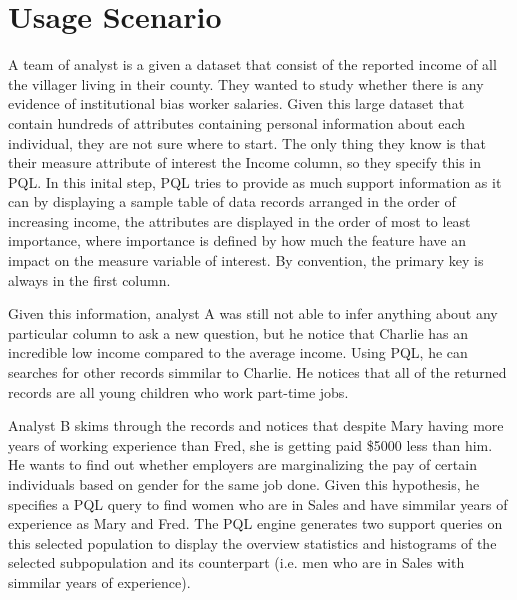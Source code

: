 \documentclass{sig-alternate-05-2015}
\begin{document}
\section{Usage Scenario}
\par A team of analyst is a given a dataset that consist of the reported income of all the villager living in their county. They wanted to study whether there is any evidence of institutional bias worker salaries. Given this large dataset that contain hundreds of attributes containing personal information about each individual, they are not sure where to start. The only thing they know is that their measure attribute of interest the Income column, so they specify this in PQL. In this inital step, PQL tries to provide as much support information as it can by displaying a sample table of data records arranged in the order of increasing income, the attributes are displayed in the order of most to least importance, where importance is defined by how much the feature have an impact on the measure variable of interest. By convention, the primary key is always in the first column. 
\par Given this information, analyst A was still not able to infer anything about any particular column to ask a new question, but he notice that Charlie has an incredible low income compared to the average income. Using PQL, he can searches for other records simmilar to Charlie. He notices that all of the returned records are all young children who work part-time jobs.
\par Analyst B skims through the records  and notices that despite Mary having more years of working experience than Fred, she is getting paid \$5000 less than him. He wants to find out whether employers are marginalizing the pay of certain individuals based on gender for the same job done. Given this hypothesis, he specifies a PQL query to find women who are in Sales and have simmilar years of experience as Mary and Fred. The PQL engine generates two support queries on this selected population to display the overview statistics and histograms of the selected subpopulation and its counterpart (i.e. men who are in Sales with simmilar years of experience).
\end{document}
